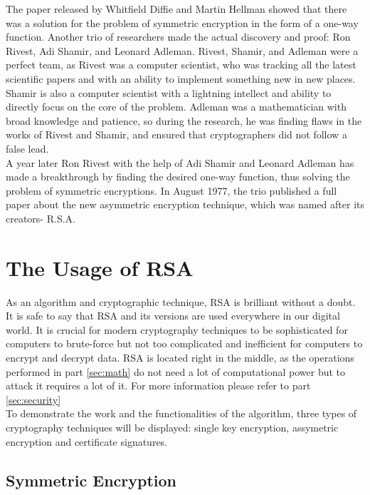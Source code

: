 \documentclass[a4paper, 12pt]{article}
\begin{document}
The paper released by Whitfield Diffie and Martin Hellman showed that there was a solution for
the problem of symmetric encryption in the form of a one-way function. Another trio of researchers
made the actual discovery and proof: Ron Rivest, Adi Shamir, and Leonard Adleman. Rivest,
Shamir, and Adleman were a perfect team, as Rivest was a computer scientist, who was tracking
all the latest scientific papers and with an ability to implement something new in new places.
Shamir is also a computer scientist with a lightning intellect and ability to directly focus on the
core of the problem. Adleman was a mathematician with broad knowledge and patience, so during
the research, he was finding flaws in the works of Rivest and Shamir, and ensured that
cryptographers did not follow a false lead.\cite{singh}\\

A year later Ron Rivest with the help of Adi Shamir
and Leonard Adleman has made a breakthrough by finding the desired one-way function, thus
solving the problem of symmetric encryptions. In August 1977, the trio published a full paper
about the new asymmetric encryption technique, which was named after its creators- R.S.A.\cite{rsapaper}\\

\section{The Usage of RSA}
\label{sec:usage}

As an algorithm and cryptographic technique, RSA is brilliant without a doubt. It is safe to say
that RSA and its versions are used everywhere in our digital world. It is crucial for modern
cryptography techniques to be sophisticated for computers to brute-force but not too complicated
and inefficient for computers to encrypt and decrypt data. RSA is located right in the middle, as
the operations performed in part \ref{sec:math} do not need a lot of computational power but to attack it requires a lot of it.
For more information please refer to part \ref{sec:security}\\

To demonstrate the work and the functionalities of the algorithm, three types of cryptography techniques will be displayed:
single key encryption, assymetric encryption and certificate signatures.\\

\subsection{Symmetric Encryption}
\label{bsec:symmetry}
\end{document}
